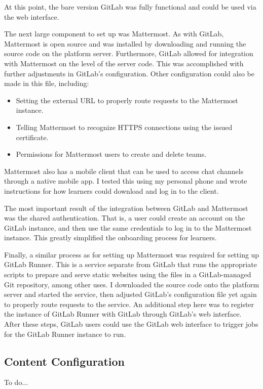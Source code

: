 \documentclass[12pt,twoside,vi]{mitthesis}
\newcommand{\wip}[1]{{\color{red} To do...}}
\begin{document}
{At this point, the bare version GitLab was fully functional and could be used via the web interface.

The next large component to set up was Mattermost. As with GitLab, Mattermost is open source and was installed by downloading and running the source code on the platform server. Furthermore, GitLab allowed for integration with Mattermost on the level of the server code. This was accomplished with further adjustments in GitLab's configuration. Other configuration could also be made in this file, including:
\begin{itemize}
\item Setting the external URL to properly route requests to the Mattermost instance.
\item Telling Mattermost to recognize HTTPS connections using the issued certificate.
\item Permissions for Mattermost users to create and delete teams.
\end{itemize}
Mattermost also has a mobile client that can be used to access chat channels through a native mobile app. I tested this using my personal phone and wrote instructions for how learners could download and log in to the client.

The most important result of the integration between GitLab and Mattermost was the shared authentication. That is, a user could create an account on the GitLab instance, and then use the same credentials to log in to the Mattermost instance. This greatly simplified the onboarding process for learners.

Finally, a similar process as for setting up Mattermost was required for setting up GitLab Runner. This is a service separate from GitLab that runs the appropriate scripts to prepare and serve static websites using the files in a GitLab-managed Git repository, among other uses. I downloaded the source code onto the platform server and started the service, then adjusted GitLab's configuration file yet again to properly route requests to the service. An additional step here was to register the instance of GitLab Runner with GitLab through GitLab's web interface. After these steps, GitLab users could use the GitLab web interface to trigger jobs for the GitLab Runner instance to run.
}

\subsection{Content Configuration}

\wip{
\begin{itemize}
\item create RLA group with permissions
\item create team-template and course-central
\item create team in mattermost
\item create channels in mattermost
\end{itemize}
}
\end{document}
